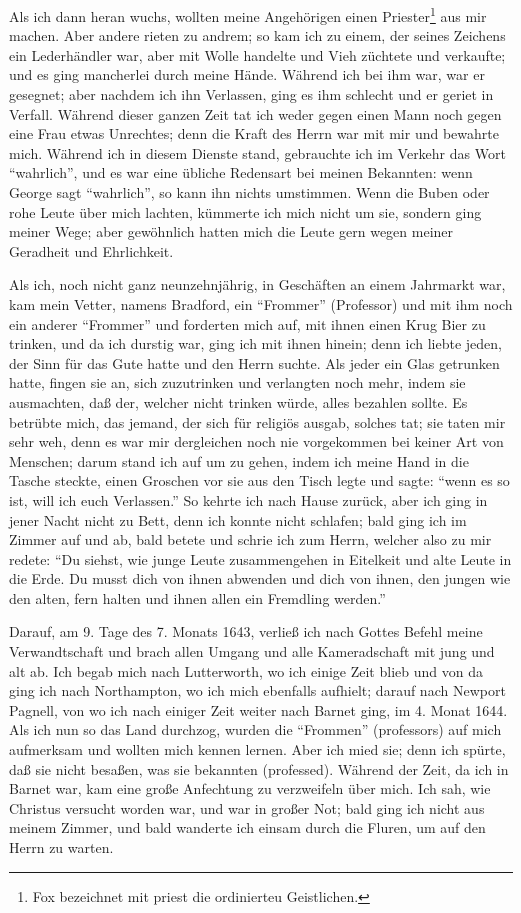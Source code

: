Als ich dann heran wuchs, wollten meine Angehörigen einen
Priester\footnote{Fox bezeichnet mit priest die ordinierteu Geistlichen.} 
aus mir machen. Aber andere rieten zu andrem; so
kam ich zu einem, der seines Zeichens ein Lederhändler war, aber
mit Wolle handelte und Vieh züchtete und verkaufte; und es ging
mancherlei durch meine Hände. Während ich bei ihm war,
war er gesegnet; aber nachdem ich ihn Verlassen, ging es ihm
schlecht und er geriet in Verfall. Während dieser ganzen Zeit
tat ich weder gegen einen Mann noch gegen eine Frau etwas
Unrechtes; denn die Kraft des Herrn war mit mir und bewahrte
mich. Während ich in diesem Dienste stand, gebrauchte ich im
Verkehr das Wort "`wahrlich"', und es war eine übliche Redensart
bei meinen Bekannten: wenn George sagt "`wahrlich"', so kann
ihn nichts umstimmen. Wenn die Buben oder rohe Leute über
mich lachten, kümmerte ich mich nicht um sie, sondern ging meiner
Wege; aber gewöhnlich hatten mich die Leute gern wegen meiner
Geradheit und Ehrlichkeit.

Als ich, noch nicht ganz neunzehnjährig, in Geschäften an
einem Jahrmarkt war, kam mein Vetter, namens Bradford, ein
"`Frommer"' (Professor) und mit ihm noch ein anderer "`Frommer"'
und forderten mich auf, mit ihnen einen Krug Bier zu trinken,
und da ich durstig war, ging ich mit ihnen hinein; denn ich
liebte jeden, der Sinn für das Gute hatte und den Herrn
suchte. Als jeder ein Glas getrunken hatte, fingen sie an, sich
zuzutrinken und verlangten noch mehr, indem sie ausmachten,
daß der, welcher nicht trinken würde, alles bezahlen sollte. Es
betrübte mich, das jemand, der sich für religiös ausgab, solches
tat; sie taten mir sehr weh, denn es war mir dergleichen noch
nie vorgekommen bei keiner Art von Menschen; darum stand ich
auf um zu gehen, indem ich meine Hand in die Tasche steckte,
einen Groschen vor sie aus den Tisch legte und sagte: "`wenn es
so ist, will ich euch Verlassen."' So kehrte ich nach Hause zurück,
aber ich ging in jener Nacht nicht zu Bett, denn ich konnte nicht
schlafen; bald ging ich im Zimmer auf und ab, bald betete und
schrie ich zum Herrn, welcher also zu mir redete: "`Du siehst, wie
junge Leute zusammengehen in Eitelkeit und alte Leute in die
Erde. Du musst dich von ihnen abwenden und dich von ihnen,
den jungen wie den alten, fern halten und ihnen allen ein
Fremdling werden."'


Darauf, am 9. Tage des 7. Monats 1643, verließ ich nach
Gottes Befehl meine Verwandtschaft und brach allen Umgang und
alle Kameradschaft mit jung und alt ab. Ich begab mich nach
Lutterworth, wo ich einige Zeit blieb und von da ging ich nach
Northampton, wo ich mich ebenfalls aufhielt; darauf nach Newport 
Pagnell, von wo ich nach einiger Zeit weiter nach Barnet
ging, im 4. Monat 1644. Als ich nun so das Land durchzog,
wurden die "`Frommen"' (professors) auf mich aufmerksam und
wollten mich kennen lernen. Aber ich mied sie; denn ich spürte,
daß sie nicht besaßen, was sie bekannten (professed). Während
der Zeit, da ich in Barnet war, kam eine große Anfechtung zu
verzweifeln über mich. Ich sah, wie Christus versucht worden
war, und war in großer Not; bald ging ich nicht aus meinem
Zimmer, und bald wanderte ich einsam durch die Fluren, um auf
den Herrn zu warten.


